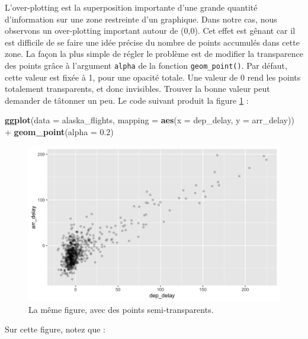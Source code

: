 \documentclass[
  a4paper,
]{article}
\newenvironment{Shaded}{\begin{snugshade}}{\end{snugshade}}
\newcommand{\DataTypeTok}[1]{\textcolor[rgb]{0.00,0.34,0.68}{#1}}
\newcommand{\FloatTok}[1]{\textcolor[rgb]{0.69,0.50,0.00}{#1}}
\newcommand{\KeywordTok}[1]{\textcolor[rgb]{0.12,0.11,0.11}{\textbf{#1}}}
\newcommand{\NormalTok}[1]{\textcolor[rgb]{0.12,0.11,0.11}{#1}}
\newcommand{\OperatorTok}[1]{\textcolor[rgb]{0.12,0.11,0.11}{#1}}
\newcommand{\StringTok}[1]{\textcolor[rgb]{0.75,0.01,0.01}{#1}}
\begin{document}
L'over-plotting est la superposition importante d'une grande quantité d'information sur une zone restreinte d'un graphique. Dans notre cas, nous observons un over-plotting important autour de (0,0). Cet effet est gênant car il est difficile de se faire une idée précise du nombre de points accumulés dans cette zone. La façon la plus simple de régler le problème est de modifier la transparence des points grâce à l'argument \texttt{alpha} de la fonction \texttt{geom\_point()}. Par défaut, cette valeur est fixée à 1, pour une opacité totale. Une valeur de 0 rend les points totalement transparents, et donc invisibles. Trouver la bonne valeur peut demander de tâtonner un peu. Le code suivant produit la figure \ref{fig:transparent} :

\begin{Shaded}
\begin{Highlighting}[]
\KeywordTok{ggplot}\NormalTok{(}\DataTypeTok{data =}\NormalTok{ alaska_flights, }
       \DataTypeTok{mapping =} \KeywordTok{aes}\NormalTok{(}\DataTypeTok{x =}\NormalTok{ dep_delay, }\DataTypeTok{y =}\NormalTok{ arr_delay)) }\OperatorTok{+}\StringTok{ }
\StringTok{  }\KeywordTok{geom_point}\NormalTok{(}\DataTypeTok{alpha =} \FloatTok{0.2}\NormalTok{)}
\end{Highlighting}
\end{Shaded}

\begin{figure}[htpb]

{\centering \includegraphics[width=0.9\linewidth]{figure/transparent-1} 

}

\caption{La même figure, avec des points semi-transparents.}\label{fig:transparent}
\end{figure}

Sur cette figure, notez que :
\end{document}
